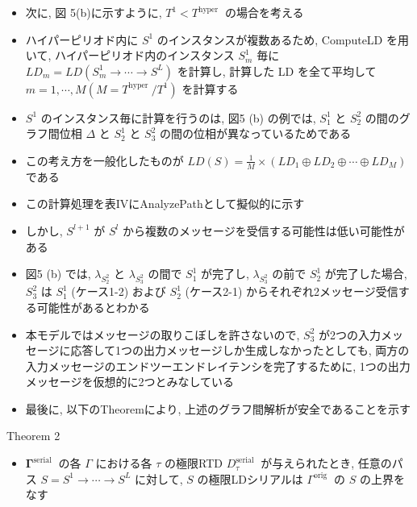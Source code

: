 \begin{frame}{}
    \begin{itemize}
        \item 次に, 図 5(b)に示すように, $T^{1}<T^{\text {hyper }}$ の場合を考える
\item ハイパーピリオド内に $S^{1}$ のインスタンスが複数あるため, ComputeLD を用いて, ハイパーピリオド内のインスタンス $S_{m}^{1}$ 毎に $L D_{m}=L D\left(S_{m}^{1} \rightarrow \cdots \rightarrow S^{L}\right)$ を計算し, 計算した LD を全て平均して $m=1, \cdots, M\left(M=T^{\text {hyper }} / T^{1}\right)$ を計算する
\item $S^{1}$ のインスタンス毎に計算を行うのは, 図5 (b) の例では, $S_{1}^{1}$ と $S_{2}^{2}$ の間のグラフ間位相 $\Delta$ と $S_{2}^{1}$ と $S_{3}^{2}$ の間の位相が異なっているためである
\item この考え方を一般化したものが $L D(S)=\frac{1}{M} \times\left(L D_{1} \oplus L D_{2} \oplus \cdots \oplus L D_{M}\right)$ である
\item この計算処理を表IVにAnalyzePathとして擬似的に示す
    \end{itemize}
\end{frame}

\begin{frame}{}
    \begin{itemize}
        \item しかし, $S^{l+1}$ が $S^{l}$ から複数のメッセージを受信する可能性は低い可能性がある
\item 図5 (b) では, $\lambda_{S_{2}^{2}}$ と $\lambda_{S_{3}^{2}}$ の間で $S_{1}^{1}$ が完了し, $\lambda_{S_{3}^{2}}$ の前で $S_{2}^{1}$ が完了した場合, $S_{3}^{2}$ は $S_{1}^{1}$  (ケース1-2) および $S_{2}^{1}$  (ケース2-1) からそれぞれ2メッセージ受信する可能性があるとわかる
\item 本モデルではメッセージの取りこぼしを許さないので, $S_{3}^{2}$ が2つの入力メッセージに応答して1つの出力メッセージしか生成しなかったとしても, 両方の入力メッセージのエンドツーエンドレイテンシを完了するために, 1つの出力メッセージを仮想的に2つとみなしている
\item 最後に, 以下のTheoremにより, 上述のグラフ間解析が安全であることを示す
    \end{itemize}
\end{frame}

\begin{frame}[label=theorem2]{Theorem 2}
    \begin{theorem}[]
        \begin{itemize}
            \item  $\boldsymbol{\Gamma}^{\text {serial }}$ の各 $\Gamma$ における各 $\tau$ の極限RTD $D_{\tau}^{\text {serial }}$ が与えられたとき, 任意のパス $S=S^{1} \rightarrow \cdots \rightarrow S^{L}$ に対して, $S$ の極限LDシリアルは $\Gamma^{\text {orig }}$ の $S$ の上界をなす
        \end{itemize}
    \end{theorem}
\end{frame}


